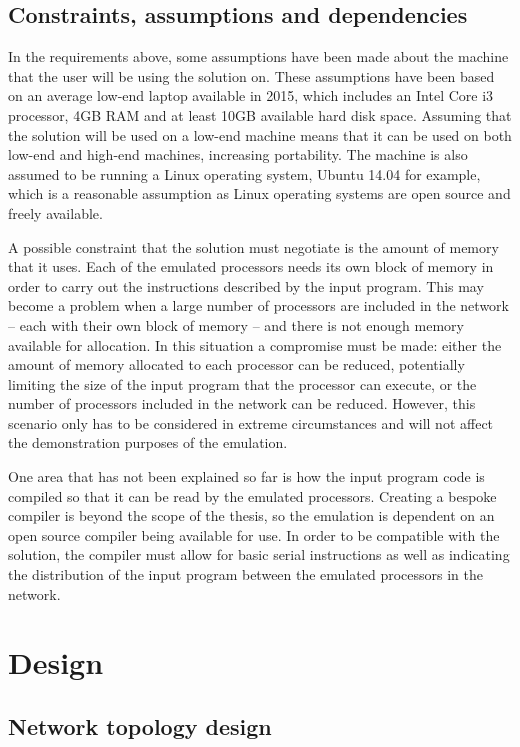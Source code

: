 \documentclass[a4paper, 12pt]{article}
\begin{document}
\subsection{Constraints, assumptions and dependencies}

In the requirements above, some assumptions have been made about the machine that the user will be using the solution on. These assumptions have been based on an average low-end laptop available in 2015, which includes an Intel Core i3 processor, 4GB RAM and at least 10GB available hard disk space. Assuming that the solution will be used on a low-end machine means that it can be used on both low-end and high-end machines, increasing portability. The machine is also assumed to be running a Linux operating system, Ubuntu 14.04 for example, which is a reasonable assumption as Linux operating systems are open source and freely available.

A possible constraint that the solution must negotiate is the amount of memory that it uses. Each of the emulated processors needs its own block of memory in order to carry out the instructions described by the input program. This may become a problem when a large number of processors are included in the network -- each with their own block of memory -- and there is not enough memory available for allocation. In this situation a compromise must be made: either the amount of memory allocated to each processor can be reduced, potentially limiting the size of the input program that the processor can execute, or the number of processors included in the network can be reduced. However, this scenario only has to be considered in extreme circumstances and will not affect the demonstration purposes of the emulation.

One area that has not been explained so far is how the input program code is compiled so that it can be read by the emulated processors. Creating a bespoke compiler is beyond the scope of the thesis, so the emulation is dependent on an open source compiler being available for use. In order to be compatible with the solution, the compiler must allow for basic serial instructions as well as indicating the distribution of the input program between the emulated processors in the network.

\newpage
\section{Design}

\subsection{Network topology design}
\end{document}
